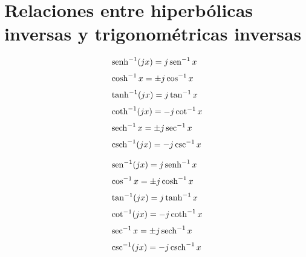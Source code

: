 \newpage
\section*{Relaciones entre hiperbólicas inversas y trigonométricas inversas}

\begin{minipage}[t]{0.5\textwidth}
\begin{align*}
& \operatorname{senh}^{-1} (jx) = j\operatorname{sen}^{-1} x\\[3pt]
& \cosh^{-1} x = \pm j \cos^{-1} x\\[3pt]
& \tanh^{-1} (jx) = j \tan^{-1} x\\[3pt]
 &\coth^{-1} (jx) = -j \cot^{-1} x\\[3pt]
& \operatorname{sech}^{-1} x = \pm j \sec^{-1} x\\[3pt]
& \operatorname{csch}^{-1} (jx) = -j \csc^{-1} x
\end{align*}
\end{minipage} 
\begin{minipage}[t]{0.5\textwidth}
\begin{align*}
& \operatorname{sen}^{-1} (jx) = j\operatorname{senh}^{-1} x\\[3pt]
& \cos^{-1} x = \pm j \cosh^{-1} x\\[3pt]
& \tan^{-1} (jx) = j \tanh^{-1} x\\[3pt]
& \cot^{-1} (jx) = -j \coth^{-1} x\\[3pt]
& \sec^{-1} x = \pm j \operatorname{sech}^{-1} x\\[3pt]
& \csc^{-1} (jx) = -j \operatorname{csch}^{-1} x
\end{align*}
\end{minipage}



